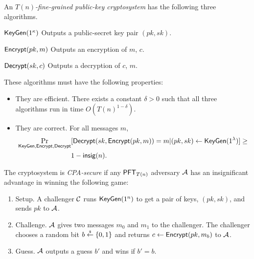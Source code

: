 \begin{definition}\label{def:fg-pkc}
	An \emph{$T(n)$-fine-grained public-key cryptosystem} has the following three algorithms.
	\begin{description}
		\item $\textsf{KeyGen}(1^\kappa)$ Outputs a public-secret key pair $(pk,sk)$.
		\item $\textsf{Encrypt}(pk, m)$ Outputs an encryption of $m$, $c$.
		\item $\textsf{Decrypt}(sk, c)$ Outputs a decryption of $c$, $m$.
	\end{description}
	These algorithms must have the following properties:
	\begin{itemize}
		\item They are efficient. There exists a constant $\delta > 0$ such that all three algorithms run in time $O\left(T(n)^{1-\delta}\right)$.
		\item They are correct. For all messages $m$,
		\begin{align*}
		\Pr_{\textsf{KeyGen},\textsf{Encrypt},\textsf{Decrypt}}&[\textsf{Decrypt}(sk, \textsf{Encrypt}(pk,m)) = m \vert (pk,sk) \gets \textsf{KeyGen}(1^\lambda)] \ge\\
		&1 - \mathsf{insig}(n). 
		\end{align*}
	\end{itemize}

The cryptosystem is \emph{CPA-secure} if any $\mathsf{PFT}_{T(n)}$ adversary $\mathcal{A}$ has an insignificant advantage in winning the following game:
	\begin{enumerate}
		\item Setup. A challenger $\mathcal{C}$ runs $\textsf{KeyGen}(1^n)$ to get a pair of keys, $(pk, sk)$, and sends $pk$ to $\mathcal{A}$.
		\item Challenge. $\mathcal{A}$ gives two messages $m_0$ and $m_1$ to the challenger. The challenger chooses a random bit $b \stackrel{\scriptscriptstyle{\$}}{\gets} \{0,1\}$ and returns $c \gets \textsf{Encrypt}(pk, m_b)$ to $\mathcal{A}$.
		\item Guess. $\mathcal{A}$ outputs a guess $b'$ and wins if $b' = b$.
	\end{enumerate}
\end{definition}
